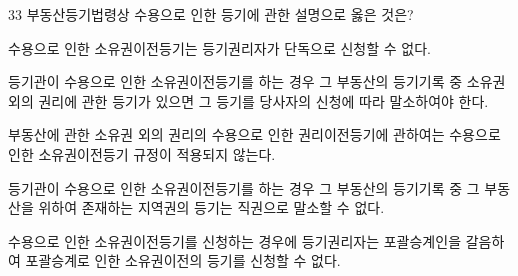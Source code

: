 \begin{question}{33}
부동산등기법령상 수용으로 인한 등기에 관한 설명으로 옳은 것은?
\begin{choices}
  \item 수용으로 인한 소유권이전등기는 등기권리자가 단독으로 신청할 수 없다.
  \item 등기관이 수용으로 인한 소유권이전등기를 하는 경우 그 부동산의 등기기록 중 소유권 외의 권리에 관한 등기가 있으면 그 등기를 당사자의 신청에 따라 말소하여야 한다.
  \item 부동산에 관한 소유권 외의 권리의 수용으로 인한 권리이전등기에 관하여는 수용으로 인한 소유권이전등기 규정이 적용되지 않는다.
  \item 등기관이 수용으로 인한 소유권이전등기를 하는 경우 그 부동산의 등기기록 중 그 부동산을 위하여 존재하는 지역권의 등기는 직권으로 말소할 수 없다.
  \item 수용으로 인한 소유권이전등기를 신청하는 경우에 등기권리자는 포괄승계인을 갈음하여 포괄승계로 인한 소유권이전의 등기를 신청할 수 없다.
\end{choices}
\end{question}
